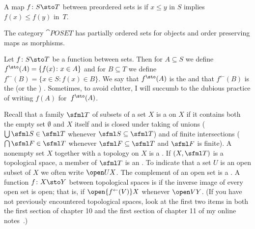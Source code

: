 \begin{defn} A map $f\colon S \sto T$ between preordered sets is
 if $x \le y$ in $S$ implies $f(x) \le f(y)$ in~$T$.
\end{defn}

\begin{exam} The category
$\cat{POSET}$ has partially ordered sets for objects and order preserving maps as morphisms.
\end{exam}

\begin{notn} Let $f \colon S \sto T$ be a function between sets. Then for $A \subseteq S$ we define
$f^{\sto}(A) = \{f(x)\colon x \in A\}$ and for $B \subseteq T$ we define
$f^{\gets}(B) = \{ x \in S\colon f(x) \in B\}$. We say that $f^{\sto}(A)$ is the
 and that $f^{\gets}(B)$ is the
 (or the
) .  Sometimes, to avoid clutter, I will succumb to the dubious practice of
writing $f(A)$ for~$f^{\sto}(A)$.
\end{notn}

\begin{defn} Recall that a family $\sfml T$ of subsets of a set $X$ is a
 on $X$ if it contains both the empty set $\emptyset$ and $X$ itself and is closed under taking of unions
($\bigcup\sfml S \in \sfml T$ whenever $\sfml S \subseteq \sfml T$) and of finite intersections ($\bigcap\sfml F \in \sfml T$
whenever $\sfml F \subseteq \sfml T$ and $\sfml F$ is finite).  A nonempty set $X$ together with a topology on $X$ is a
. If $(X,\sfml T)$ is a topological space, a member of $\sfml T$ is an
.  To indicate that a set $U$ is an open subset of $X$ we often write $\open UX$.  The complement of an open set is a
.  A function $f\colon X \sto Y$ between topological spaces is
 if the inverse image of every open set is open; that is, if $\open{f^{\gets}(V)}X$ whenever $\open VY$.
(If you have not previously encountered topological spaces, look at the first two items in both the first section of
chapter 10 and the first section of chapter 11 of my online notes~\cite{Erdman:2007}.)
\end{defn}

